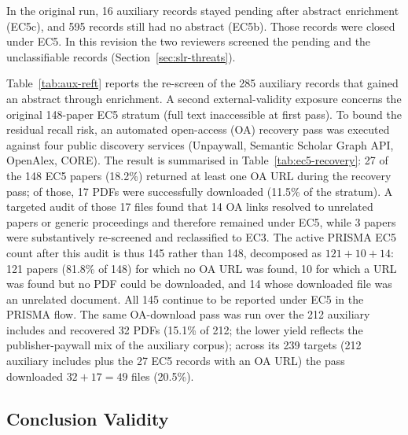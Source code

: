 In the original run, 16 auxiliary records stayed pending after abstract
enrichment (EC5c), and 595 records still had no abstract (EC5b). Those
records were closed under EC5. In this revision the two reviewers screened the pending
and the unclassifiable records (Section~\ref{sec:slr-threats}).







Table~\ref{tab:aux-reft} reports the re-screen of the 285 auxiliary
records that gained an abstract through enrichment. A second
external-validity exposure concerns the original 148-paper EC5
stratum (full text inaccessible at first pass). To bound the residual recall
risk, an
automated open-access (OA) recovery pass was executed against four public
discovery services (Unpaywall, Semantic Scholar Graph API, OpenAlex, CORE).
The result is summarised in Table~\ref{tab:ec5-recovery}: 27 of the 148 EC5
papers (18.2\%) returned at least one OA URL during the recovery pass; of
those, 17 PDFs were successfully downloaded (11.5\% of the stratum).
A targeted audit of those 17 files found that 14 OA links resolved to
unrelated papers or generic proceedings and therefore remained under EC5,
while 3 papers were substantively re-screened and reclassified to EC3.
The active PRISMA EC5 count after this audit is thus 145 rather than 148,
decomposed as $121 + 10 + 14$: 121 papers (81.8\% of 148) for which no OA
URL was found, 10 for which a URL was found but no PDF could be
downloaded, and 14 whose downloaded file was an unrelated document. All
145 continue to be reported under EC5 in the PRISMA flow. The same
OA-download pass was run over the 212 auxiliary includes and recovered 32
PDFs (15.1\% of 212; the lower yield reflects the publisher-paywall mix
of the auxiliary corpus); across its 239 targets (212 auxiliary includes
plus the 27 EC5 records with an OA URL) the pass downloaded $32+17 = 49$
files (20.5\%).



\subsection{Conclusion Validity}

